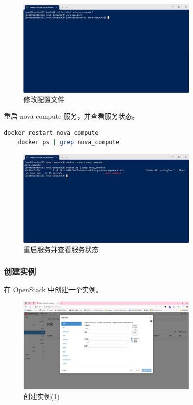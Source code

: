 \documentclass{article}
\begin{document}
\begin{figure}[H]
    \centering
    \includegraphics[width=0.8\textwidth]{img/10.5.png}
    \caption{修改配置文件}
\end{figure}

重启 nova-compute 服务，并查看服务状态。

\begin{lstlisting}[language=bash]
    docker restart nova_compute
    docker ps | grep nova_compute
\end{lstlisting}

\begin{figure}[H]
    \centering
    \includegraphics[width=0.8\textwidth]{img/10.6.png}
    \caption{重启服务并查看服务状态}
\end{figure}

\subsubsection{创建实例}

在 OpenStack 中创建一个实例。

\begin{figure}[H]
    \centering
    \includegraphics[width=0.8\textwidth]{img/11.1.png}
    \caption{创建实例(1)}
\end{figure}
\end{document}

